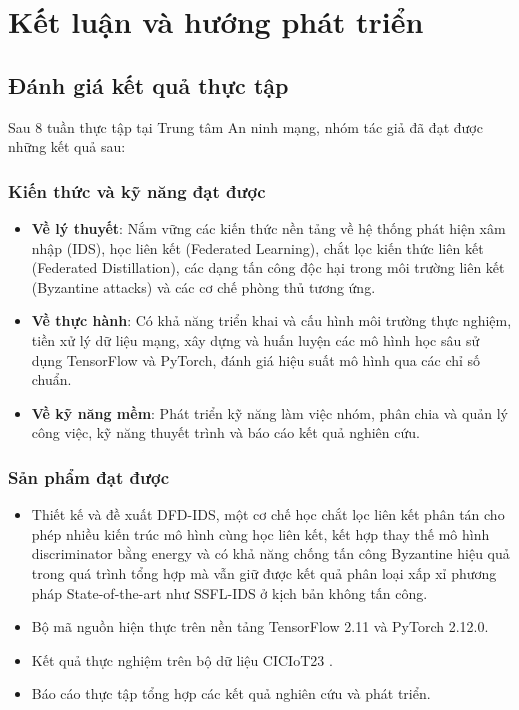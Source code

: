 
\chapter{Kết luận và hướng phát triển}

\section{Đánh giá kết quả thực tập}
\label{sec:assessment}

Sau 8 tuần thực tập tại Trung tâm An ninh mạng, nhóm tác giả đã đạt được những kết quả sau:

\subsection{Kiến thức và kỹ năng đạt được}
\begin{itemize}
    \item \textbf{Về lý thuyết}: Nắm vững các kiến thức nền tảng về hệ thống phát hiện xâm nhập (IDS), học liên kết (Federated Learning), chắt lọc kiến thức liên kết (Federated Distillation), các dạng tấn công độc hại trong môi trường liên kết (Byzantine attacks) và các cơ chế phòng thủ tương ứng.
    \item \textbf{Về thực hành}: Có khả năng triển khai và cấu hình môi trường thực nghiệm, tiền xử lý dữ liệu mạng, xây dựng và huấn luyện các mô hình học sâu sử dụng TensorFlow và PyTorch, đánh giá hiệu suất mô hình qua các chỉ số chuẩn.
    \item \textbf{Về kỹ năng mềm}: Phát triển kỹ năng làm việc nhóm, phân chia và quản lý công việc, kỹ năng thuyết trình và báo cáo kết quả nghiên cứu.
\end{itemize}

\subsection{Sản phẩm đạt được}
\begin{itemize}
    \item Thiết kế và đề xuất DFD-IDS, một cơ chế học chắt lọc liên kết phân tán cho phép nhiều kiến trúc mô hình cùng học liên kết, kết hợp thay thế mô hình discriminator bằng energy và có khả năng chống tấn công Byzantine hiệu quả trong quá trình tổng hợp mà vẫn giữ được kết quả phân loại xấp xỉ phương pháp State-of-the-art như SSFL-IDS ở kịch bản không tấn công.
    \item Bộ mã nguồn hiện thực trên nền tảng TensorFlow 2.11 và PyTorch 2.12.0.
    \item Kết quả thực nghiệm trên bộ dữ liệu CICIoT23 \cite{neto2023ciciot2023}.
    \item Báo cáo thực tập tổng hợp các kết quả nghiên cứu và phát triển.
\end{itemize}

